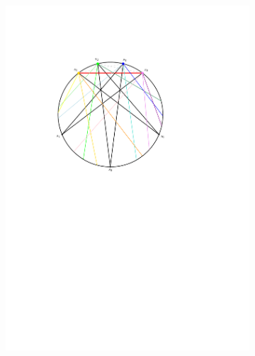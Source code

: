 \documentclass{amsart}
\theoremstyle{remark}
\begin{document}
\begin{figure}
  \centering
  \begin{subfigure}[b]{.48\textwidth}
	\centering
	\includegraphics[width=\textwidth,page=1]{exFlattening}
  \end{subfigure}
  \begin{subfigure}[b]{.48\textwidth}
    \centering

\end{subfigure}
\end{figure}
\end{document}
